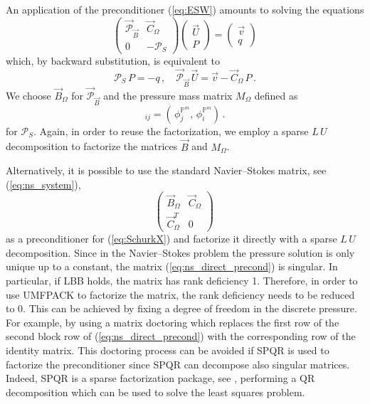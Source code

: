 \documentclass[a4paper,12pt,onecolumn]{article}
\newcommand{\pspace}{\mathbb{P}}
\begin{document}
An application of the preconditioner (\ref{eq:ESW}) amounts to solving the
equations
\begin{equation*}
\begin{pmatrix}
\vec{\mathcal{P}}_{\vec B} & \vec C_\Omega \\
0 & -\mathcal{P}_S
\end{pmatrix}
\begin{pmatrix} \vec U \\ P \end{pmatrix}
= \begin{pmatrix} \vec v \\ q \end{pmatrix}
\end{equation*}
which, by backward substitution, is equivalent to
\begin{equation}\label{eq:blocksolution}
\mathcal{P}_S\,P = -q\,,\quad \vec{\mathcal{P}}_{\vec B}\,\vec U = \vec v -
\vec C_\Omega\,P\,.
\end{equation}
We choose $\vec B_\Omega$  for $\vec{\mathcal{P}}_{\vec B}$ and the pressure
mass matrix $M_\Omega$ defined as
\begin{equation*}
[M_\Omega]_{ij} = \left(\,\phi_j^{\pspace^m},\, \phi_i^{\pspace^m}\right)\,.
\end{equation*}
for $\mathcal{P}_S$. Again, in order to reuse the factorization, we employ a
sparse $L\,U$ decomposition to factorize the matrices $\vec B$ and $M_\Omega$.

Alternatively, it is possible to use the standard Navier--Stokes matrix, see
(\ref{eq:ns_system}),
\begin{equation}\label{eq:ns_direct_precond}
\begin{pmatrix}
\vec B_\Omega & \vec C_\Omega \\
\vec C_\Omega^T & 0
\end{pmatrix}\,
\end{equation}
as a preconditioner for (\ref{eq:SchurkX}) and factorize it directly with a
sparse $L\,U$ decomposition. Since in the Navier--Stokes problem the pressure
solution is only unique up to a constant, the matrix
(\ref{eq:ns_direct_precond}) is singular. In particular, if LBB holds, the
matrix has rank deficiency 1. Therefore, in order to use UMFPACK to factorize
the matrix, the rank deficiency needs to be reduced to 0. This can be achieved
by fixing a degree of freedom in the discrete pressure. For example, by
using a matrix doctoring which replaces the first row of the second block row
of (\ref{eq:ns_direct_precond}) with the corresponding row of the identity
matrix. This doctoring
process can be avoided if SPQR is used to factorize the preconditioner since
SPQR can decompose also singular matrices. Indeed, SPQR is a sparse
factorization package, see \cite{Davis11}, performing a QR decomposition which
can be used to solve the least squares problem.
\end{document}
